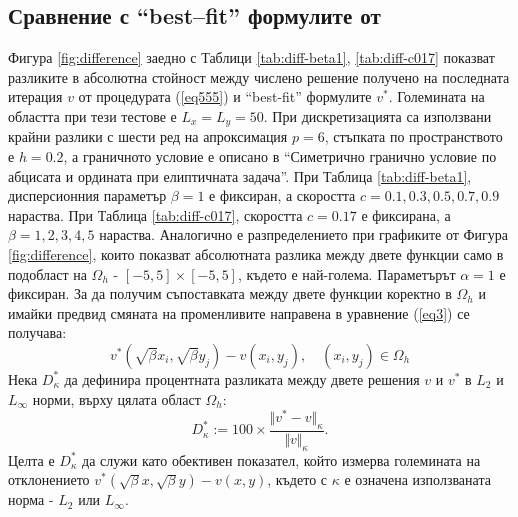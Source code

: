 \documentclass{article}
\newcommand{\be}{\begin{equation}}
\newcommand{\ee}{\end{equation}}
\newcommand{\rf}[1]{(\ref{#1})}
\begin{document}
\subsection{Сравнение с ``best--fit'' формулите от \cite{Ch2011} }
Фигура \ref{fig:difference} заедно с Таблици \ref{tab:diff-beta1}, \ref{tab:diff-c017} показват разликите в абсолютна стойност между числено решение получено на последната итерация $v$ от процедурата \rf{eq555} и ``best-fit'' формулите $v^*$. Големината на областта при тези тестове е $L_x = L_y = 50$. При дискретизацията са използвани крайни разлики с шести ред на апроксимация $p=6$, стъпката по пространството е $h=0.2$, а граничното условие е описано в ``Симетрично гранично условие по абцисата и ордината при елиптичната задача''. При Таблица \ref{tab:diff-beta1}, дисперсионния параметър $\beta=1$ е фиксиран, а скоростта $c = 0.1, 0.3, 0.5, 0.7, 0.9$ нараства. При Таблица \ref{tab:diff-c017}, скоростта $c = 0.17$ е фиксирана, а $\beta=1, 2, 3, 4, 5$ нараства. Аналогично е разпределението при графиките от Фигура \ref{fig:difference}, които показват абсолютната разлика между двете функции само в подобласт на $\Omega_h$ - $[-5,  5] \times [-5,5]$, където е най-голема. Параметърът $\alpha = 1$ е фиксиран. За да получим съпоставката между двете функции коректно в $\Omega_h$ и имайки предвид смяната на променливите направена в уравнение \rf{eq3} се получава:
\be
v^*\left(\sqrt{\beta}x_i,\sqrt{\beta}y_j\right)-v(x_i,y_j), \quad (x_i,y_j) \in \Omega_h
\ee
Нека $D^*_{\kappa}$ да дефинира процентната разликата между двете решения $v$ и $v^*$ в ${L_2 }$ и ${L_\infty}$ норми, върху цялата област $\Omega_h$:
\be\label{diffvv}
D^*_{\kappa} := 100 \times \frac{\Vert v^*-v \Vert_{\kappa} }{ \Vert v \Vert_{\kappa} }.
\ee
Целта е $D^*_{\kappa}$ да служи като обективен показател, който измерва големината на отклонението $v^*(\sqrt{\beta}x,\sqrt{\beta}y)-v(x,y)$, където с $\kappa$ е означена използваната норма - ${L_2 }$ или ${L_\infty}$.
\end{document}
